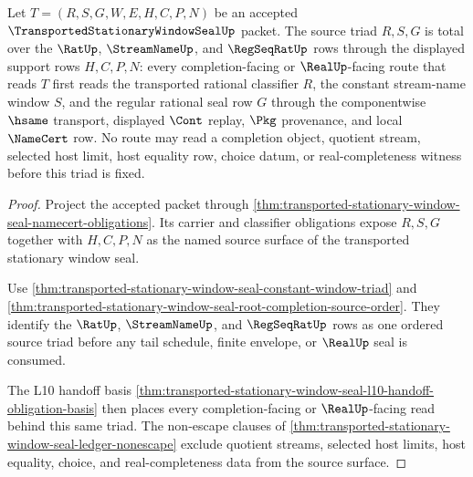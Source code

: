\begin{theorem}
\label{thm:transported-stationary-window-seal-source-triad-totality}
Let $T=(R,S,G,W,E,H,C,P,N)$ be an accepted $\TransportedStationaryWindowSealUp$ packet. The source triad $R,S,G$ is total over the $\RatUp$, $\StreamNameUp$, and $\RegSeqRatUp$ rows through the displayed support rows $H,C,P,N$: every completion-facing or $\RealUp$-facing route that reads $T$ first reads the transported rational classifier $R$, the constant stream-name window $S$, and the regular rational seal row $G$ through the componentwise $\hsame$ transport, displayed $\Cont$ replay, $\Pkg$ provenance, and local $\NameCert$ row. No route may read a completion object, quotient stream, selected host limit, host equality row, choice datum, or real-completeness witness before this triad is fixed.
\end{theorem}
\begin{proof}
Project the accepted packet through \autoref{thm:transported-stationary-window-seal-namecert-obligations}. Its carrier and classifier obligations expose $R,S,G$ together with $H,C,P,N$ as the named source surface of the transported stationary window seal.

Use \autoref{thm:transported-stationary-window-seal-constant-window-triad} and \autoref{thm:transported-stationary-window-seal-root-completion-source-order}. They identify the $\RatUp$, $\StreamNameUp$, and $\RegSeqRatUp$ rows as one ordered source triad before any tail schedule, finite envelope, or $\RealUp$ seal is consumed.

The L10 handoff basis \autoref{thm:transported-stationary-window-seal-l10-handoff-obligation-basis} then places every completion-facing or $\RealUp$-facing read behind this same triad. The non-escape clauses of \autoref{thm:transported-stationary-window-seal-ledger-nonescape} exclude quotient streams, selected host limits, host equality, choice, and real-completeness data from the source surface.
\end{proof}

